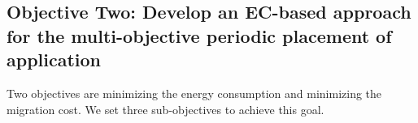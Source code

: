 \subsection{Objective Two: Develop an EC-based approach for the multi-objective periodic placement of application}
 Two objectives are minimizing the energy consumption and minimizing the migration cost.
We set three sub-objectives to achieve this goal. 

